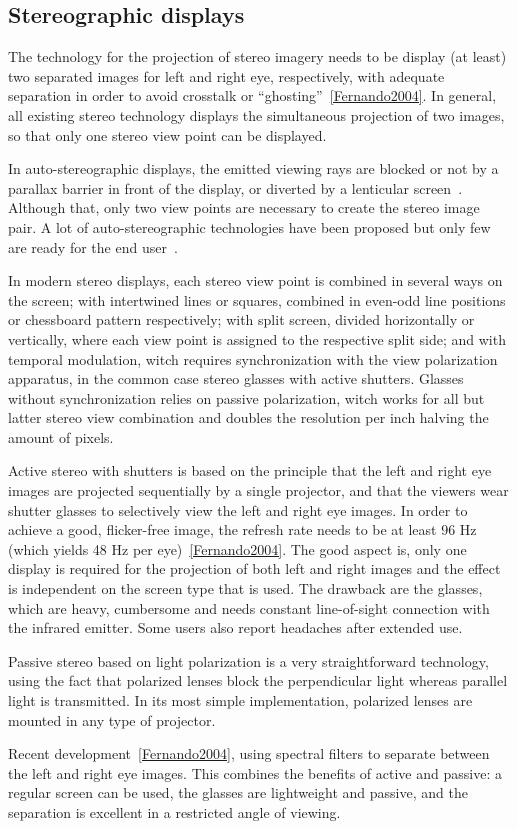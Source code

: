 \subsection{Stereographic displays}
\label{sec.stereographic_displays}

The technology for the projection of stereo imagery needs to be display (at least) two separated images for left and right eye, respectively, with adequate separation in order to avoid crosstalk or “ghosting”~\ref{Fernando2004}. In general, all existing stereo technology displays the simultaneous projection of two images, so that only one stereo view point can be displayed. 

In auto-stereographic displays, the emitted viewing rays are blocked or not by a parallax barrier in front of the display, or diverted by a lenticular screen~\cite{Konrad2007}. Although that, only two view points are necessary to create the stereo image pair. A lot of auto-stereographic technologies have been proposed but only few are ready for the end user~\cite{Harris2010}. 

In modern stereo displays, each stereo view point is combined in several ways on the screen; with intertwined lines or squares, combined in even-odd line positions or chessboard pattern respectively; with split screen, divided horizontally or vertically, where each view point is assigned to the respective split side; and with temporal modulation, witch requires synchronization with the view polarization apparatus, in the common case stereo glasses with active shutters. Glasses without synchronization relies on passive polarization, witch works for all but latter stereo view combination and doubles the resolution per inch halving the amount of pixels.

Active stereo with shutters is based on the principle that the left and right eye images are projected sequentially by a single projector, and that the viewers wear shutter glasses to selectively view the left and right eye images. In order to achieve a good, flicker-free image, the refresh rate needs to be at least 96 Hz (which yields 48 Hz per eye)~\ref{Fernando2004}. The good aspect is, only one display is required for the projection of both left and right images and the effect is independent on the screen type that is used. The drawback are the glasses, which are heavy, cumbersome and needs constant line-of-sight connection with the infrared emitter. Some users also report headaches after extended use.

Passive stereo based on light polarization is a very straightforward technology, using the fact that polarized lenses block the perpendicular light whereas parallel light is transmitted. In its most simple implementation, polarized lenses are mounted in any type of projector. 

Recent development~\ref{Fernando2004}, using spectral filters to separate between the left and right eye images. This combines the benefits of active and passive: a regular screen can be used, the glasses are lightweight and passive, and the separation is excellent in a restricted angle of viewing.